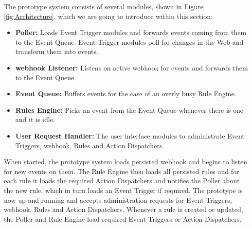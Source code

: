 The prototype system consists of several modules, shown in Figure \ref{fig:Architecture}, which we are going to introduce within this section:
\begin{itemize}
	\item \textbf{\textrm{Poller}:} Loads \textrm{Event Trigger} modules and forwards events coming from them to the \textrm{Event Queue}. \textrm{Event Trigger} modules poll for changes in the Web and transform them into events. 
	\item \textbf{\textrm{\gls{webhook} Listener}:} Listens on active \textrm{\gls{webhook}} for events and forwards them to the \textrm{Event Queue}.
	\item \textbf{\textrm{Event Queue}:} Buffers events for the case of an overly busy \textrm{Rule Engine}. 
	\item \textbf{\textrm{Rules Engine}:} Picks an event from the \textrm{Event Queue} whenever there is one and it is idle. 
	\item \textbf{\textrm{User Request Handler}:} The user interface modules to administrate \textrm{Event Triggers}, \textrm{\gls{webhook}}, \textrm{Rules} and \textrm{Action Dispatchers}.
\end{itemize}

When started, the prototype system loads persisted \textrm{\gls{webhook}} and begins to listen for new events on them.
The \textrm{Rule Engine} then loads all persisted rules and for each rule it loads the required \textrm{Action Dispatchers} and notifies the \textrm{Poller} about the new rule, which in turn loads an \textrm{Event Trigger} if required.
The prototype is now up and running and accepts administration requests for \textrm{Event Triggers}, \textrm{\gls{webhook}}, \textrm{Rules} and \textrm{Action Dispatchers}.
Whenever a rule is created or updated, the \textrm{Poller} and \textrm{Rule Engine} load required \textrm{Event Triggers} or \textrm{Action Dispatchers}.

